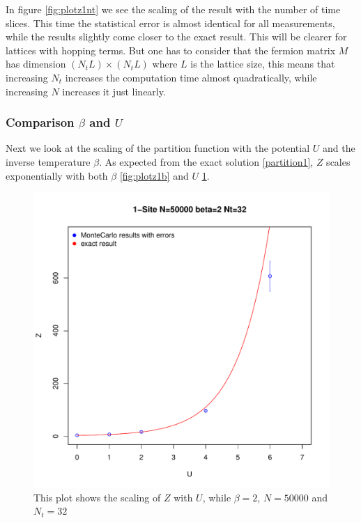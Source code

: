 In figure \ref{fig:plotz1nt} we see the scaling of the result with the number of time slices. This time the statistical error is almost identical for all measurements, while the results slightly come closer to the exact result. This will be clearer for lattices with hopping terms. But one has to consider that the fermion matrix $M$ has dimension $(N_tL)\times(N_tL)$ where $L$ is the lattice size, this means that increasing $N_t$ increases the computation time almost quadratically, while increasing $N$ increases it just linearly.
\subsubsection{Comparison $\beta$ and $U$}
Next we look at the scaling of the partition function with the potential $U$ and the inverse temperature $\beta$.
As expected from the exact solution \eqref{partition1}, $Z$ scales exponentially with both $\beta$ \ref{fig:plotz1b} and $U$ \ref{fig:plotz1u}. 
\begin{figure}[H]
	\centering
	\includegraphics[width=0.5\linewidth]{figs/plot_Z1U}
	\caption[Scaling of Z with U]{This plot shows the scaling of $Z$ with $U$, while $\beta=2$, $N=50000$ and $N_t=32$}
	\label{fig:plotz1u}
\end{figure}

